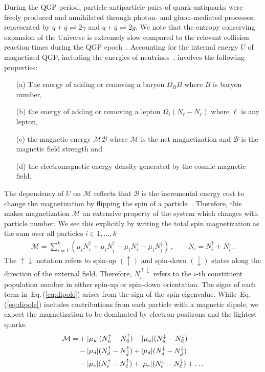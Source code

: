 \documentclass[epjST]{svjour}
\newcommand{\req}[1]{Eq.\,(\ref{#1})}
\begin{document}
During the QGP period, particle-antiparticle pairs of quark-antiquarks were freely produced and annihilated through photon- and gluon-mediated processes, represented by \(q+\bar{q}\rightleftharpoons2\gamma\) and \(q+\bar{q}\rightleftharpoons2g\). We note that the entropy conserving expansion of the Universe is extremely slow compared to the relevant collision reaction times during the QGP epoch~\cite{Yang:2024ret}. Accounting for the internal energy $U$ of magnetized QGP, including the energies of neutrinos~\cite{Birrell:2014ona}, involves the following properties: 
\begin{itemize}
\item[(a)] The energy of adding or removing a baryon $\Omega_{B}B$ where \(B\) is baryon number,
\item[(b)] the energy of adding or removing a lepton $\Omega_{\ell}(N_{\ell}-N_{\ell})$ where $\ell$ is any lepton, 
\item[(c)] the magnetic energy $\mathcal{M}\mathcal{B}$ where $\mathcal{M}$ is the net magnetization and $\mathcal{B}$ is the magnetic field strength and
\item[(d)] the electromagnetic energy density generated by the cosmic magnetic field.
\end{itemize}

The dependency of $U$ on $\mathcal{M}$ reflects that $\mathcal{B}$ is the incremental energy cost to change the magnetization by flipping the spin of a particle~\cite{Bali:2014kia}. Therefore, this makes magnetization $\mathcal{M}$ an extensive property of the system which changes with particle number. We see this explicitly by writing the total spin magnetization as the sum over all particles $i\in{1,\ldots,k}$
\begin{align}
\label{eq:dipole}
\mathcal{M} = \sum_{i=1}^{k}(\mu_{i}N_{i}^{\uparrow} + \mu_{\bar{i}}N_{\bar{i}}^{\uparrow} - \mu_{i}N_{i}^{\downarrow} - \mu_{\bar{i}}N_{\bar{i}}^{\downarrow})\,,\qquad
N_{i} = N_{i}^{\uparrow} + N_{i}^{\downarrow}\,.
\end{align}
The $\uparrow\downarrow$ notation refers to spin-up $(\uparrow)$ and spin-down $(\downarrow)$ states along the direction of the external field. Therefore, $N_{i}^{\uparrow\downarrow}$ refers to the $i$-th constituent population number in either spin-up or spin-down orientation. The signs of each term in~\req{eq:dipole} arises from the sign of the spin eigenvalue. While~\req{eq:dipole} includes contributions from each particle with a magnetic dipole, we expect the magnetization to be dominated by electron-positrons and the lightest quarks.
\begin{align}
\notag\mathcal{M} = &+|\mu_{u}|(N_{u}^{\uparrow}-N_{\bar{u}}^{\uparrow})-|\mu_{u}|(N_{u}^{\downarrow}-N_{\bar{u}}^{\downarrow})\\
\notag &-|\mu_{d}|(N_{d}^{\uparrow}-N_{\bar{d}}^{\uparrow})+|\mu_{d}|(N_{d}^{\downarrow}-N_{\bar{d}}^{\downarrow})\\
\label{eq:dipole2}
&-|\mu_{e}|(N_{e}^{\uparrow}-N_{\bar{e}}^{\uparrow})+|\mu_{e}|(N_{e}^{\downarrow}-N_{\bar{e}}^{\downarrow})+\ldots
\end{align}
\end{document}
